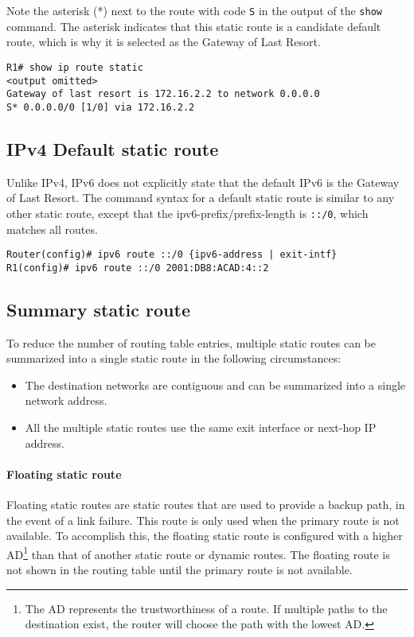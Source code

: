 Note the asterisk (*) next to the route with code \verb|S| in the output of the \verb|show| command. The asterisk indicates that this static route is a candidate default route, which is why it is selected as the Gateway of Last Resort.

\begin{verbatim}
R1# show ip route static
<output omitted>
Gateway of last resort is 172.16.2.2 to network 0.0.0.0
S* 0.0.0.0/0 [1/0] via 172.16.2.2
\end{verbatim}

\subsection{IPv4 Default static route}  

Unlike IPv4, IPv6 does not explicitly state that the default IPv6 is the Gateway of Last Resort. The command syntax for a default static route is similar to any other static route, except that the ipv6-prefix/prefix-length is \verb|::/0|, which matches all routes.

\begin{verbatim}
Router(config)# ipv6 route ::/0 {ipv6-address | exit-intf}
R1(config)# ipv6 route ::/0 2001:DB8:ACAD:4::2
\end{verbatim}

\subsection{Summary static route}

To reduce the number of routing table entries, multiple static routes can be summarized into a single static route in the following circumstances:

\begin{itemize}
\item The destination networks are contiguous and can be summarized into a single network address.
\item All the multiple static routes use the same exit interface or next-hop IP address.
\end{itemize}

\paragraph{Floating static route}

Floating static routes are static routes that are used to provide a backup path, in the event of a link failure. This route is only used when the primary route is not available. To accomplish this, the floating static route is configured with a higher AD\footnote{The AD represents the trustworthiness of a route. If multiple paths to the destination exist, the router will choose the path with the lowest AD.} than that of another static route or dynamic routes. The floating route is not shown in the routing table until the primary route is not available.

